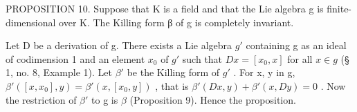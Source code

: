 PROPOSITION 10. Suppose that K is a field and that the Lie algebra g is finite-dimensional over K. The Killing form β of g is completely invariant.

Let D be a derivation of g. There exists a Lie algebra \(g'\) containing g as an ideal of codimension 1 and an element \(x_{0}\) of \(g'\) such that \(Dx = [x_{0}, x]\) for all \(x \in g\) (§ 1, no. 8, Example 1). Let \(\beta'\) be the Killing form of \(g'\) . For x, y in g, \(\beta'([x, x_{0}], y) = \beta'(x, [x_{0}, y])\) , that is \(\beta'(Dx, y) + \beta'(x, Dy) = 0\) . Now the restriction of \(\beta'\) to g is \(\beta\) (Proposition 9). Hence the proposition.

